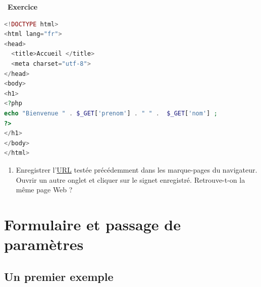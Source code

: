 \documentclass[
  11pt,
]{article}
\providecommand{\tightlist}{%
  \setlength{\itemsep}{0pt}\setlength{\parskip}{0pt}}
\newcounter{exo}
\newenvironment{exercice}[1]
{\par \medskip   \addtocounter{exo}{1} \noindent  
\begin{bclogo}[arrondi =0.1,   noborder = true, logo=\bccrayon, marge=4]{~\textbf{Exercice} \textbf{\theexo} {\itshape #1} }  \par}
{
\end{bclogo}
 \par \bigskip }
\newcounter{rque}
\newcounter{def}
\begin{document}
\begin{exercice}{}
\begin{lstlisting}[language=PHP]
 <!DOCTYPE html>
<html lang="fr">
<head>
  <title>Accueil </title>
  <meta charset="utf-8">    
</head> 
<body>
<h1>
<?php  
echo "Bienvenue " . $_GET['prenom'] . " " .  $_GET['nom'] ;
?>
</h1>
</body>
</html> 
\end{lstlisting}

\begin{enumerate}
\def\labelenumi{\arabic{enumi}.}
\setcounter{enumi}{3}
\tightlist
\item
  Enregistrer
  l'\href{https://developer.mozilla.org/fr/docs/Glossaire/URL}{URL}
  testée précédemment dans les marque-pages du navigateur. Ouvrir un
  autre onglet et cliquer sur le signet enregistré. Retrouve-t-on la
  même page Web ?
\end{enumerate}

\end{exercice}

\hypertarget{formulaire-et-passage-de-paramuxe8tres}{%
\section{Formulaire et passage de
paramètres}\label{formulaire-et-passage-de-paramuxe8tres}}

\hypertarget{un-premier-exemple}{%
\subsection{Un premier exemple}\label{un-premier-exemple}}
\end{document}
